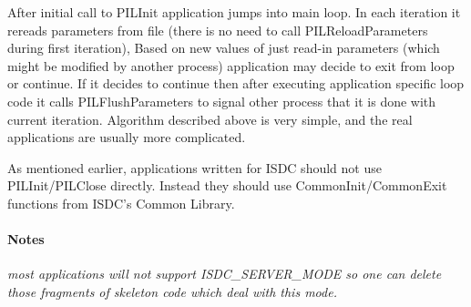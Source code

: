 After initial call to PILInit application jumps into main loop. In each
iteration it rereads parameters from file
(there is no need to call PILReloadParameters during first iteration), Based
on new values of just read-in
parameters (which might be modified by another process) application may
decide to exit from loop or continue.
If it decides to continue then after executing application specific loop
code it calls PILFlushParameters to signal
other process that it is done with current iteration. Algorithm described
above is very simple, and the real applications are usually more complicated. 

As mentioned earlier, applications written for ISDC should not use
PILInit/PILClose directly. Instead they should
use CommonInit/CommonExit functions from ISDC's Common Library. 

\paragraph{Notes\\}
{\it
most applications will not support ISDC\_SERVER\_MODE so one can delete
those fragments of skeleton code which deal with this mode.
}
